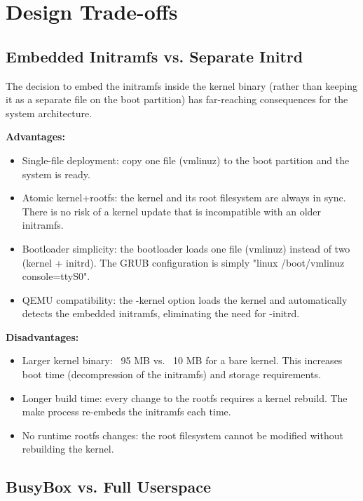 \section{Design Trade-offs}

\subsection{Embedded Initramfs vs. Separate Initrd}

The decision to embed the initramfs inside the kernel binary (rather than
keeping it as a separate file on the boot partition) has far-reaching
consequences for the system architecture.

\textbf{Advantages:}
\begin{itemize}[nosep]
  \item Single-file deployment: copy one file (vmlinuz) to the boot
        partition and the system is ready.
  \item Atomic kernel+rootfs: the kernel and its root filesystem are always
        in sync. There is no risk of a kernel update that is incompatible
        with an older initramfs.
  \item Bootloader simplicity: the bootloader loads one file (vmlinuz)
        instead of two (kernel + initrd). The GRUB configuration is simply
        "linux /boot/vmlinuz console=ttyS0".
  \item QEMU compatibility: the -kernel option loads the kernel and
        automatically detects the embedded initramfs, eliminating the
        need for -initrd.
\end{itemize}

\textbf{Disadvantages:}
\begin{itemize}[nosep]
  \item Larger kernel binary: ~95 MB vs. ~10 MB for a bare kernel. This
        increases boot time (decompression of the initramfs) and storage
        requirements.
  \item Longer build time: every change to the rootfs requires a kernel
        rebuild. The make process re-embeds the initramfs each time.
  \item No runtime rootfs changes: the root filesystem cannot be modified
        without rebuilding the kernel.
\end{itemize}

\subsection{BusyBox vs. Full Userspace}

